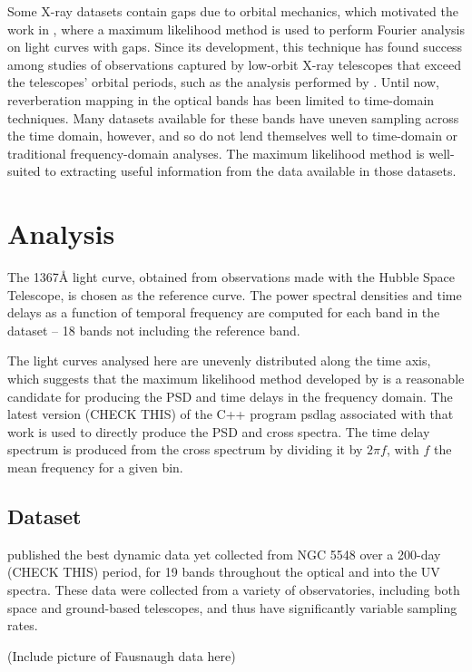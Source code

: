 \documentclass[11pt,letterpaper]{article}
\begin{document}
 	Some X-ray datasets contain gaps due to orbital mechanics, which motivated the work in \cite{2013ApJ...777...24Z}, where a maximum likelihood method is used to perform Fourier analysis on light curves with gaps. Since its development, this technique has found success among studies of observations captured by low-orbit X-ray telescopes that exceed the telescopes' orbital periods, such as the analysis performed by \cite{2016arXiv160606736K}. Until now, reverberation mapping in the optical bands has been limited to time-domain techniques. Many datasets available for these bands have uneven sampling across the time domain, however, and so do not lend themselves well to time-domain or traditional frequency-domain analyses. The maximum likelihood method is well-suited to extracting useful information from the data available in those datasets.

\section{Analysis}
The 1367\AA$ $ light curve, obtained from observations made with the Hubble Space Telescope, is chosen as the reference curve. The power spectral densities and time delays as a function of temporal frequency are computed for each band in the dataset -- 18 bands not including the reference band.

The light curves analysed here are unevenly distributed along the time axis, which suggests that the maximum likelihood method developed by \cite{2013ApJ...777...24Z} is a reasonable candidate for producing the PSD and time delays in the frequency domain. The latest version (CHECK THIS) of the C++ program psdlag associated with that work is used to directly produce the PSD and cross spectra. The time delay spectrum is produced from the cross spectrum by dividing it by $2 \pi f$, with $f$ the mean frequency for a given bin.

	\subsection{Dataset}
	\cite{2016ApJ...821...56F} published the best dynamic data yet collected from NGC 5548 over a 200-day (CHECK THIS) period, for 19 bands throughout the optical and into the UV spectra. These data were collected from a variety of observatories, including both space and ground-based telescopes, and thus have significantly variable sampling rates.

	(Include picture of Fausnaugh data here)
\end{document}
